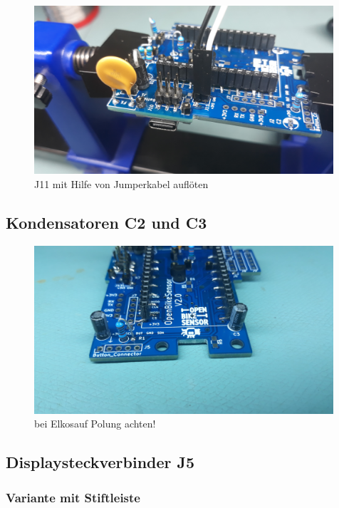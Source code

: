 \documentclass[12pt, a4paper]{article}		%
\begin{document}
\begin{figure}[H]
	\centering
		\includegraphics[width=0.99\textwidth]{Grafiken/20200726_182044.jpg}
	\caption{J11 mit Hilfe von Jumperkabel auflöten}
	\label{fig:20200726_182044}
\end{figure}

\subsection{Kondensatoren C2 und C3}

\begin{figure}[H]
	\centering
		\includegraphics[width=0.99\textwidth]{Grafiken/20200726_182349.jpg}
	\caption[bla]{bei Elkos\footnotemark  auf Polung achten!}
	\label{fig:20200726_182349}
\end{figure}


\subsection{Displaysteckverbinder J5}

\subsubsection{Variante mit Stiftleiste}

%
%
\end{document}
